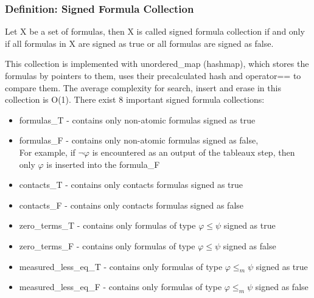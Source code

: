 \documentclass{article}
\begin{document}
		\subsubsection*{Definition: Signed Formula Collection}
			Let X be a set of formulas, then X is called signed formula collection if and only if all formulas in X are signed as true 
			or all formulas are signed as false.

			This collection is implemented with unordered\_map (hashmap),
			which stores the formulas by pointers to them, uses their precalculated hash and operator== to compare them.
			The average complexity for search, insert and erase in this collection is O(1).
		\newline
		\newline
		There exist 8 important signed formula collections:
		\begin{itemize}
			\item formulas\_T - contains only non-atomic formulas signed as true
			\item formulas\_F - contains only non-atomic formulas signed as false, \\
				For example, if $\neg\varphi$ is encountered as an output of the tableaux step, then only $\varphi$ is inserted into the formula\_F
			\item contacts\_T - contains only contacts formulas signed as true
			\item contacts\_F - contains only contacts formulas signed as false
			\item zero\_terms\_T - contains only formulas of type $\varphi \le \psi$ signed as true
			\item zero\_terms\_F - contains only formulas of type $\varphi \le \psi$ signed as false
			\item measured\_less\_eq\_T - contains only formulas of type $\varphi \le_m \psi$ signed as true
			\item measured\_less\_eq\_F - contains only formulas of type $\varphi \le_m \psi$ signed as false
		\end{itemize}
\end{document}
